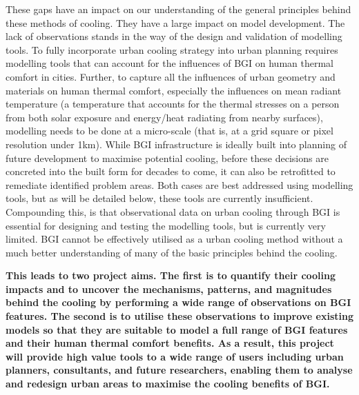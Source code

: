 These gaps have an impact on our understanding of the general principles behind these methods of cooling. They have a large impact on model development. The lack of observations stands in the way of the design and validation of modelling tools. To fully incorporate urban cooling strategy into urban planning requires modelling tools that can account for the influences of BGI on human thermal comfort in cities. Further, to capture all the influences of urban geometry and materials on human thermal comfort, especially the influences on mean radiant temperature\cite{Kantor2011} (a temperature that accounts for the thermal stresses on a person from both solar exposure and energy/heat radiating from nearby surfaces), modelling needs to be done at a micro-scale (that is, at a grid square or pixel resolution under 1km). While BGI infrastructure is ideally built into planning of future development to maximise potential cooling, before these decisions are concreted into the built form for decades to come, it can also be retrofitted to remediate identified problem areas. Both cases are best addressed using modelling tools, but as will be detailed below, these tools are currently insufficient. Compounding this, is that observational data on urban cooling through BGI is essential for designing and testing the modelling tools, but is currently very limited.  BGI cannot be effectively utilised as a urban cooling method without a much better understanding of many of the basic principles behind the cooling. 

\textbf{This leads to two project aims. The first is to quantify their cooling impacts and to uncover the mechanisms, patterns, and magnitudes behind the cooling by performing a wide range of observations on BGI features. The second is to utilise these observations to improve existing models so that they are suitable to model a full range of BGI features and their human thermal comfort benefits. As a result, this project will provide high value tools to a wide range of users including urban planners, consultants, and future researchers, enabling them to analyse and redesign urban areas to maximise the cooling benefits of BGI.}


